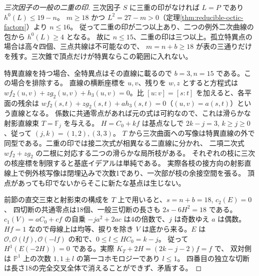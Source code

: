 \begin{proof}[三次因子の一般の二重の印]
三次因子 $S$ に三重の印がなければ $L=P$ であり $h^0(L)\le19-n$。
$m\ge18$ かつ $L^2=27-m>0$（定理\ref{thm:reducible-octic-factors}）より $n\le16$。
従って二重の印が二つ以上あり、二つの例外二次曲線の包から $h^0(L)\ge4$ となる。
故に $n\le15$、二重の印は三つ以上。孤立特異点の場合は高々四個、三点共線は不可能なので、
$m=n+b\ge18$ が表の三通りだけを残す。三次錐で頂点だけが特異ならこの範囲に入れない。

特異直線を持つ場合、全特異点はその直線に載るので $b=3,n=15$ である。この場合を排除する。
直線の横断座標を $u,v$、残りを $w,z$ とすると方程式は
$w f_2(u,v)+z g_2(u,v)+h_3(u,v)=0$。比 $[u:v]=[s:t]$ を加えると、各平面の残余は
$w f_2(s,t)+z g_2(s,t)+a h_3(s,t)=0$（$(u,v)=a(s,t)$）という直線となる。
係数に共通零点があれば元の式は可約なので、これは滑らかな射影直線束 $T=\mathbb F_j$ を与える。
$H=C_0+kf$ は基点なしで $2k-j=3$, $k\ge j\ge0$、従って $(j,k)=(1,2),(3,3)$。
$T$ から三次曲面への写像は特異直線の外で同型である。二重の印では接二次式が相異なる二直線に分かれ、
二項二次式 $w f_2+z g_2$ の二根に対応する二つの滑らかな局所枝がある。
それぞれの枝に三次の核座標を制限すると基底イデアルは単純である。
実際各枝の接方向の射影直線上で例外核写像は閉埋込みで次数1であり、一次部が枝の余接空間を張る。
頂点があっても印でないからそこに新たな基点は生じない。

前節の直交三束と射影束の構成を $T$ 上で用いると、$s=n+b=18$, $c_2(E)=0$、
四切断の共通零点は18個、一般三切断の長さも $2s-6H^2=18$ である。
$c_1(V)=a C_0+c f$ の自乗 $-ja^2+2ac$ は4の倍数で、$j$ は奇数ゆえ $a$ は偶数。
$Hf=1$ なので母線上は均等、捩りを除き $V$ は底から来る。$E$ は
$\mathcal O,\mathcal O(lf),\mathcal O(-lf)$ の和で、$0\le l\le H C_0=k-j$。
従って $H^1(E(-2H))=0$ である。実際 $K_T+2H=(2k-j-2)f=f$ で、
双対側は $\mathbb P^1$ 上の次数 $1,1\pm l$ の第一コホモロジーであり $l\le1$。
四番目の独立な切断は長さ18の完全交叉全体で消えることができず、矛盾する。
\end{proof}
